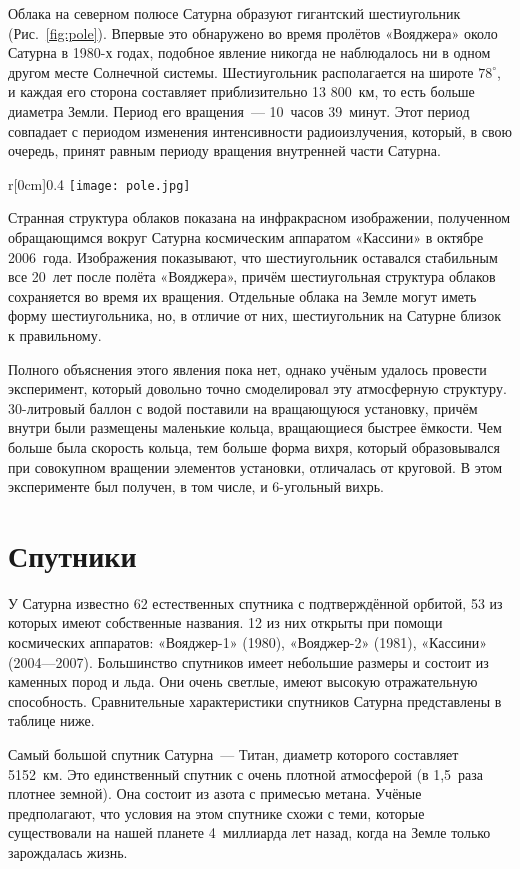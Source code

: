 \documentclass{article}
\begin{document}
    Облака на северном полюсе Сатурна образуют гигантский шестиугольник (Рис.~\ref{fig:pole}). Впервые это обнаружено во время пролётов «Вояджера» около Сатурна в 1980-х годах, подобное явление никогда не наблюдалось ни в одном другом месте Солнечной системы. Шестиугольник располагается на широте $78^{\circ}$, и каждая его сторона составляет приблизительно 13 800~км, то есть больше диаметра Земли. Период его вращения~--- 10~часов 39~минут. Этот период совпадает с периодом изменения интенсивности радиоизлучения, который, в свою очередь, принят равным периоду вращения внутренней части Сатурна.\par
    \begin{wrapfigure}[16]{r}[0cm]{0.4\textwidth}
        \vspace{-0.5pc}
        \texttt{[image: pole.jpg]}
        \caption{}
        \label{fig:pole}
    \end{wrapfigure}
    Странная структура облаков показана на инфракрасном изображении, полученном обращающимся вокруг Сатурна космическим аппаратом «Кассини» в октябре 2006~года. Изображения показывают, что шестиугольник оставался стабильным все 20~лет после полёта «Вояджера», причём шестиугольная структура облаков сохраняется во время их вращения. Отдельные облака на Земле могут иметь форму шестиугольника, но, в отличие от них, шестиугольник на Сатурне близок к правильному.\par
    Полного объяснения этого явления пока нет, однако учёным удалось провести эксперимент, который довольно точно смоделировал эту атмосферную структуру. 30-литровый баллон с водой поставили на вращающуюся установку, причём внутри были размещены маленькие кольца, вращающиеся быстрее ёмкости. Чем больше была скорость кольца, тем больше форма вихря, который образовывался при совокупном вращении элементов установки, отличалась от круговой. В этом эксперименте был получен, в том числе, и 6-угольный вихрь.\par

\section{Спутники}
    У Сатурна известно 62 естественных спутника с подтверждённой орбитой, 53 из которых имеют собственные названия. 12 из них открыты при помощи космических аппаратов: «Вояджер-1» (1980), «Вояджер-2» (1981), «Кассини» (2004—2007). Большинство спутников имеет небольшие размеры и состоит из каменных пород и льда. Они очень светлые, имеют высокую отражательную способность. Сравнительные характеристики спутников Сатурна представлены в таблице ниже.\par
    Самый большой спутник Сатурна~--- Титан, диаметр которого составляет 5152~км. Это единственный спутник с очень плотной атмосферой (в 1,5~раза плотнее земной). Она состоит из азота с примесью метана. Учёные предполагают, что условия на этом спутнике схожи с теми, которые существовали на нашей планете 4~миллиарда лет назад, когда на Земле только зарождалась жизнь.\par
    
\end{document}
